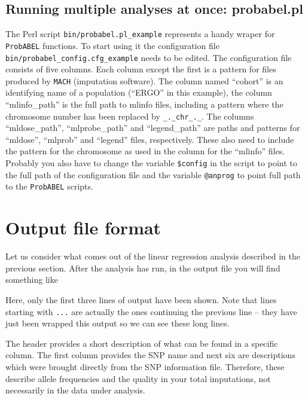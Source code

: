 \documentclass[12pt,a4paper]{article}
\begin{document}
\subsection{Running multiple analyses at once: probabel.pl}

The Perl script \texttt{bin/probabel.pl\_example} represents a handy
wraper for \texttt{ProbABEL} functions.  To start using it the
configuration file \texttt{bin/probabel\_config.cfg\_example} needs to
be edited. The configuration file consists of five columns. Each
column except the first is a pattern for files produced by
\texttt{MACH} (imputation software). The column named ``cohort'' is an
identifying name of a population (``ERGO'' in this example), the
column ``mlinfo\_path'' is the full path to mlinfo files, including a
pattern where the chromosome number has been replaced by
\texttt{\_.\_chr\_.\_}. The columns ``mldose\_path'',
``mlprobe\_path'' and ``legend\_path'' are paths and patterns for
``mldose'', ``mlprob'' and ``legend'' files, respectively. These also
need to include the pattern for the chromosome as used in the column
for the ``mlinfo'' files. Probably you also have to change the variable
\texttt{\$config} in the script to point to the full path of the
configuration file and the variable \texttt{@anprog} to point full
path to the \texttt{ProbABEL} scripts.


\section{Output file format}
Let us consider what comes out of the linear regression analysis 
described in the previous section. After the analysis has run, in 
the output file you will find something like
\begin{small}

\end{small}

Here, only the first three lines of output have been shown. Note that lines 
starting with \texttt{...} are actually the ones continuing the 
previous line -- they have just been wrapped this output so we can see 
these long lines. 

The header provides a short description of what can be found in a
specific column. The first column provides the SNP name and 
next six are descriptions which were brought directly from the 
SNP information file. Therefore, these describe allele frequencies and 
the quality in your total imputations, not necessarily in the data under 
analysis. 
\end{document}
